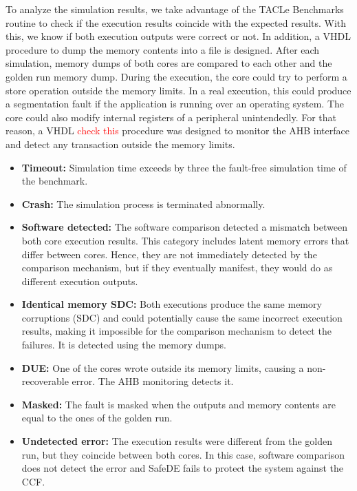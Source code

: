 To analyze the simulation results, we take advantage of the TACLe Benchmarks routine to check if the execution results coincide with the expected results. With this, we know if both execution outputs were correct or not. In addition, a VHDL procedure to dump the memory contents into a file is designed. After each simulation, memory dumps of both cores are compared to each other and the golden run memory dump. During the execution, the core could try to perform a store operation outside the memory limits. In a real execution, this could produce a segmentation fault if the application is running over an operating system. The core could also modify internal registers of a peripheral unintendedly. For that reason, a VHDL \textcolor{red}{check this} procedure was designed to monitor the AHB interface and detect any transaction outside the memory limits.

\begin{itemize}
    \item \textbf{Timeout:} Simulation time exceeds by three the fault-free simulation time of the benchmark.
    \item \textbf{Crash:} The simulation process is terminated abnormally.
    \item \textbf{Software detected:} The software comparison detected a mismatch between both core execution results. This category includes latent memory errors that differ between cores. Hence, they are not immediately detected by the comparison mechanism, but if they eventually manifest, they would do as different execution outputs.
    \item \textbf{Identical memory SDC:} Both executions produce the same memory corruptions (SDC) and could potentially cause the same incorrect execution results, making it impossible for the comparison mechanism to detect the failures. It is detected using the memory dumps.
    \item \textbf{DUE:} One of the cores wrote outside its memory limits, causing a non-recoverable error. The AHB monitoring detects it.
    \item \textbf{Masked:} The fault is masked when the outputs and memory contents are equal to the ones of the golden run.
    \item \textbf{Undetected error:} The execution results were different from the golden run, but they coincide between both cores. In this case, software comparison does not detect the error and SafeDE fails to protect the system against the CCF.
\end{itemize}


